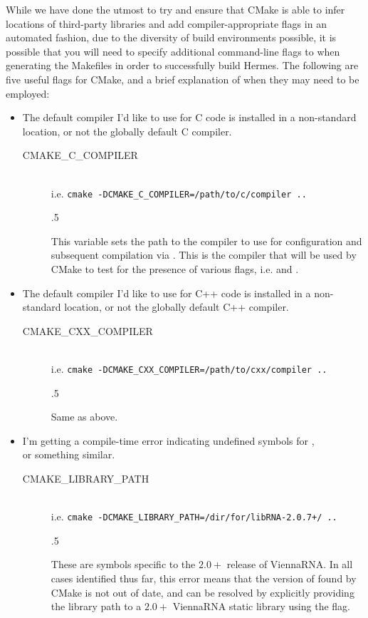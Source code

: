 \documentclass[11pt]{article}
\begin{document}
While we have done the utmost to try and ensure that CMake is able to infer locations of third-party libraries and add compiler-appropriate flags in an automated fashion, due to the diversity of build environments possible, it is possible that you will need to specify additional command-line flags to  when generating the Makefiles in order to successfully build Hermes. The following are five useful flags for CMake, and a brief explanation of when they may need to be employed:
\begin{itemize}
	\item The default compiler I'd like to use for C code is installed in a non-standard location, or not the globally default C compiler.
	\begin{description}
		\item[CMAKE\_C\_COMPILER] \hfill \\
		i.e. {\tt cmake -DCMAKE\_C\_COMPILER=/path/to/c/compiler ..} \hfill \\
		\begin{spacing}
			{.5}
		\end{spacing}
		This variable sets the path to the compiler to use for configuration and subsequent compilation via . This is the compiler that will be used by CMake to test for the presence of various flags, i.e.  and .
	\end{description}

	\item The default compiler I'd like to use for C++ code is installed in a non-standard location, or not the globally default C++ compiler.
	\begin{description}
		\item[CMAKE\_CXX\_COMPILER] \hfill \\
		i.e. {\tt cmake -DCMAKE\_CXX\_COMPILER=/path/to/cxx/compiler ..} \hfill \\
		\begin{spacing}
			{.5}
		\end{spacing}
		Same as above.
	\end{description}

	\item I'm getting a compile-time error indicating undefined symbols for , \\
	 or something similar.
	\begin{description}
		\item[CMAKE\_LIBRARY\_PATH] \hfill \\
		i.e. {\tt cmake -DCMAKE\_LIBRARY\_PATH=/dir/for/libRNA-2.0.7+/ ..} \hfill \\
		\begin{spacing}
			{.5}
		\end{spacing}
		These are  symbols specific to the $2.0+$ release of ViennaRNA. In all cases identified thus far, this error means that the version of  found by CMake is not out of date, and can be resolved by explicitly providing the library path to a $2.0+$ ViennaRNA static library using the  flag.
	\end{description}


\end{itemize}
\end{document}
